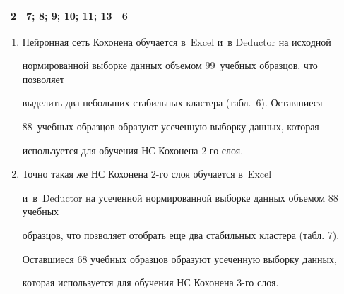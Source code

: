 \begin{description}
\begin{table}[b]
\begin{center}
\begin{tabular}{|c|l|c|}
2&7; 8; 9; 10; 11; 13&6\\


\hline


\end{tabular}


\end{center}


\end{table}





\noindent


  \begin{enumerate}[1.]


\item Нейронная сеть Кохонена обучается в~Excel и~в Deductor на исходной 


нормированной выборке данных объемом 99~учебных образцов, что позволяет 


выделить два небольших стабильных кластера (табл.~6). Оставшиеся 


88~учебных образцов образуют усеченную выборку данных, которая 


используется для обучения НС Кохонена 2-го слоя.











\item Точно такая же НС Кохонена 2-го слоя обучается в~Excel 


и~в~Deductor на усеченной нормированной выборке данных объемом 88 учебных 


образцов, что позволяет отобрать еще два стабильных кластера (табл. 7). 


Оставшиеся 68 учебных образцов образуют усеченную выборку данных, 


которая используется для обучения НС Кохонена 3-го слоя.





\begin{table}[h]\small %


\vspace*{-3pt}


\begin{center}




\vspace*{2ex}






\end{center}
\end{table}
\end{enumerate}
\end{description}
